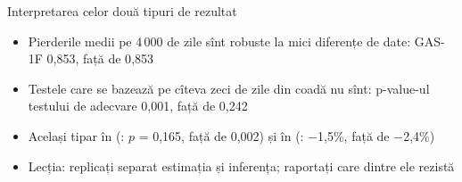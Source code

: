 \begin{frame}{Interpretarea celor două tipuri de rezultat}
\itemsize{\small}
\begin{itemize}
    \item Pierderile medii pe 4\,000 de zile sînt robuste la mici diferențe de date: GAS-1F 0{,}853, față de 0{,}853
    \item Testele care se bazează pe cîteva zeci de zile din coadă nu sînt: p-value-ul testului de adecvare 0{,}001, față de 0{,}242
    \item Același tipar în  (: $p$ = 0{,}165, față de 0{,}002) și în  (: $-$1{,}5\%, față de $-$2{,}4\%)
    \item Lecția: replicați separat estimația și inferența; raportați care dintre ele rezistă
\end{itemize}
\end{frame}

